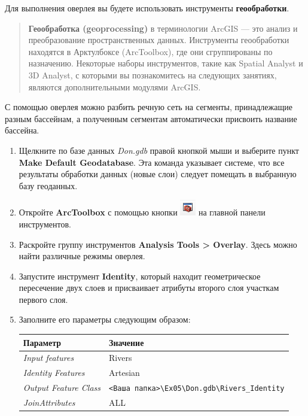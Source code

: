 \documentclass[]{book}
\theoremstyle{definition}
\theoremstyle{definition}
\theoremstyle{definition}
\theoremstyle{remark}
\begin{document}
Для выполнения оверлея вы будете использовать инструменты
\textbf{геообработки}.

\begin{quote}
\textbf{Геообработка (geoprocessing)} в терминологии ArcGIS --- это
анализ и преобразование пространственных данных. Инструменты
геообработки находятся в Арктулбоксе (ArcToolbox), где они сгруппированы
по назначению. Некоторые наборы инструментов, такие как Spatial Analyst
и 3D Analyst, с которыми вы познакомитесь на следующих занятиях,
являются дополнительными модулями ArcGIS.
\end{quote}

С помощью оверлея можно разбить речную сеть на сегменты, принадлежащие
разным бассейнам, а полученным сегментам автоматически присвоить
название бассейна.

\begin{enumerate}
\def\labelenumi{\arabic{enumi}.}
\item
  Щелкните по базе данных \emph{Don.gdb} правой кнопкой мыши и выберите
  пункт \textbf{Make Default Geodatabase}. Эта команда указывает
  системе, что все результаты обработки данных (новые слои) следует
  помещать в выбранную базу геоданных.
\item
  Откройте \textbf{ArcToolbox} с помощью кнопки
  \includegraphics{images/Ex05/image19.png} на главной панели
  инструментов.
\item
  Раскройте группу инструментов \textbf{Analysis Tools \textgreater{}
  Overlay}. Здесь можно найти различные режимы оверлея.
\item
  Запустите инструмент \textbf{Identity}, который находит геометрическое
  пересечение двух слоев и присваивает атрибуты второго слоя участкам
  первого слоя.
\item
  Заполните его параметры следующим образом:

  \begin{longtable}[]{@{}ll@{}}
  \toprule
  Параметр & Значение\tabularnewline
  \midrule
  \endhead
  \emph{Input features} & Rivers\tabularnewline
  \emph{Identity Features} & Artesian\tabularnewline
  \emph{Output Feature Class} &
  \texttt{\textless{}Ваша\ папка\textgreater{}\textbackslash{}Ex05\textbackslash{}Don.gdb\textbackslash{}Rivers\_Identity}\tabularnewline
  \emph{JoinAttributes} & ALL\tabularnewline
  \bottomrule
  \end{longtable}


\end{enumerate}
\end{document}
